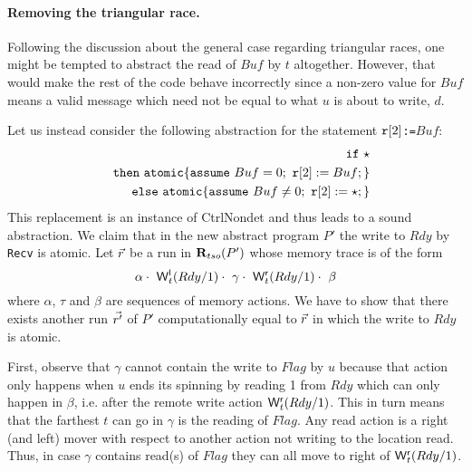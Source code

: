 \paragraph{Removing the triangular race.}
Following the discussion about the general case regarding triangular races, one might be tempted to abstract the read of $Buf$ by $t$ altogether.
However, that would make the rest of the code behave incorrectly since a non-zero value for $Buf$ means a valid message which need not be equal to what $u$ is about to write, $d$.

Let us instead consider the following abstraction for the statement {\tt $\mathtt{r}[2]$:=$Buf$}:
\begin{eqnarray*}
&&\mathtt{if}\ {\star}\\
&&\mathtt{then}\ \mathtt{atomic}\{\mathtt{assume}\ Buf=0;\ \mathtt{r}[2]:=Buf;\}\\
&&\mathtt{else}\ \mathtt{atomic}\{\mathtt{assume}\ Buf\neq0;\ \mathtt{r}[2]:=\star;\}
\end{eqnarray*}
This replacement is an instance of {\sc\small CtrlNondet} and thus leads to a sound abstraction.
We claim that in the new abstract program $P'$ the write to $Rdy$ by {\tt Recv} is atomic.
Let $\vec{r}$ be a run in $\mathbf{R}_{tso}(P')$ whose memory trace is of the form
\[
\alpha\cdot\ \mathsf{W}^{\mathsf{l}}_{t}(Rdy/1)\cdot\ \gamma\cdot\ \mathsf{W}^{\mathsf{r}}_{t}(Rdy/1)\cdot\ \beta
\]
where $\alpha$, $\tau$ and $\beta$ are sequences of memory actions.
We have to show that there exists another run $\vec{r'}$ of $P'$ computationally equal to $\vec{r}$  in which the write to $Rdy$ is atomic.

First, observe that $\gamma$ cannot contain the write to $Flag$ by $u$ because that action only happens when $u$ ends its spinning by reading 1 from $Rdy$ which can only happen in $\beta$, i.e. after the remote write action $\mathsf{W}^{\mathsf{r}}_{t}(Rdy/1)$.
This in turn means that the farthest $t$ can go in $\gamma$ is the reading of $Flag$.
Any read action is a right (and left) mover with respect to another action not writing to the location read.
Thus, in case $\gamma$ contains read(s) of $Flag$ they can all move to right of $\mathsf{W}^{\mathsf{r}}_{t}(Rdy/1)$.


